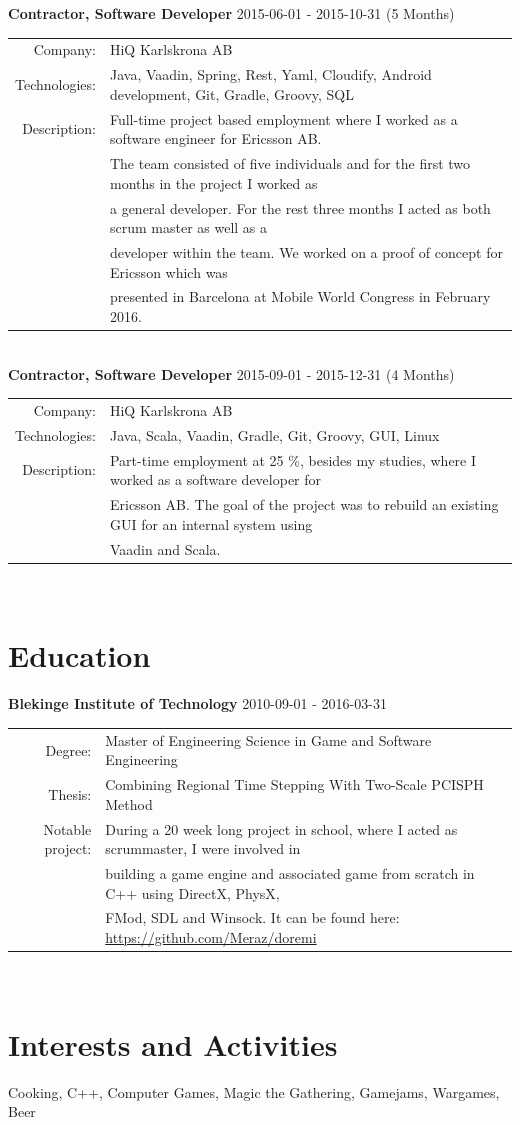 \documentclass[a4paper,10pt]{article}
\begin{document}
\textbf{Contractor, Software Developer} 2015-06-01 - 2015-10-31 (5 Months)\\
\begin{tabular}{rl}
Company:& HiQ Karlskrona AB \\
Technologies:&  Java, Vaadin, Spring, Rest, Yaml, Cloudify, Android development, Git, Gradle, Groovy, SQL\\
Description:& Full-time project based employment where I worked as a software engineer for Ericsson AB.\\&
The team consisted of five individuals and for the first two months in the project I worked as\\&
a general developer. For the rest three months I acted as both scrum master as well as a\\&
developer within the team. We worked on a proof of concept for Ericsson which was\\& 
presented in Barcelona at Mobile World Congress in February 2016.\\
\end{tabular}\\

\textbf{Contractor, Software Developer} 2015-09-01 - 2015-12-31 (4 Months) \\
\begin{tabular}{rl}
Company:& HiQ Karlskrona AB \\
Technologies:&  Java, Scala, Vaadin, Gradle, Git, Groovy, GUI, Linux\\
Description:& Part-time employment at 25 \%, besides my studies, where I worked as a software developer for\\&
Ericsson AB. The goal of the project was  to rebuild an existing GUI for an internal system using\\&
Vaadin and Scala.
\end{tabular}\\

\section{Education}
\textbf{Blekinge Institute of Technology} 2010-09-01 - 2016-03-31 \\
\begin{tabular}{rl}
Degree:&  Master of Engineering Science in Game and Software Engineering\\
Thesis:& Combining Regional Time Stepping With Two-Scale PCISPH Method\\
Notable project:& During a 20 week long project in school, where I acted as scrummaster, I were involved in\\&
building a game engine and  associated game from scratch in C++ using DirectX, PhysX,\\&
FMod, SDL and Winsock. It can be found here: \url{https://github.com/Meraz/doremi}
\end{tabular}\\

\section{Interests and Activities}
Cooking, C++, Computer Games, Magic the Gathering, Gamejams, Wargames, Beer
\end{document}
